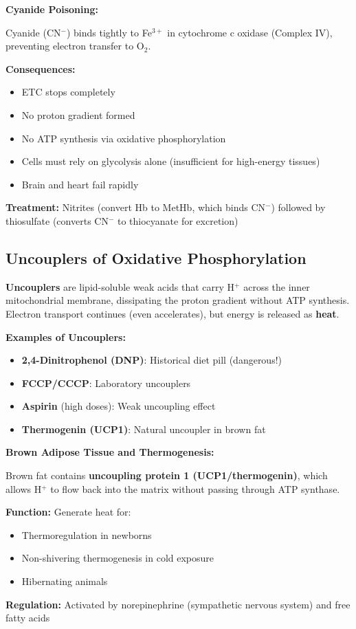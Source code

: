 \begin{example}
\textbf{Cyanide Poisoning:}

Cyanide (CN$^-$) binds tightly to Fe$^{3+}$ in cytochrome c oxidase (Complex IV), preventing electron transfer to O$_2$.

\textbf{Consequences:}
\begin{itemize}
    \item ETC stops completely
    \item No proton gradient formed
    \item No ATP synthesis via oxidative phosphorylation
    \item Cells must rely on glycolysis alone (insufficient for high-energy tissues)
    \item Brain and heart fail rapidly
\end{itemize}

\textbf{Treatment:} Nitrites (convert Hb to MetHb, which binds CN$^-$) followed by thiosulfate (converts CN$^-$ to thiocyanate for excretion)
\end{example}

\subsection{Uncouplers of Oxidative Phosphorylation}

\begin{definition}
\textbf{Uncouplers} are lipid-soluble weak acids that carry H$^+$ across the inner mitochondrial membrane, dissipating the proton gradient without ATP synthesis. Electron transport continues (even accelerates), but energy is released as \textbf{heat}.
\end{definition}

\textbf{Examples of Uncouplers:}
\begin{itemize}
    \item \textbf{2,4-Dinitrophenol (DNP)}: Historical diet pill (dangerous!)
    \item \textbf{FCCP/CCCP}: Laboratory uncouplers
    \item \textbf{Aspirin} (high doses): Weak uncoupling effect
    \item \textbf{Thermogenin (UCP1)}: Natural uncoupler in brown fat
\end{itemize}

\begin{theorem}
\textbf{Brown Adipose Tissue and Thermogenesis:}

Brown fat contains \textbf{uncoupling protein 1 (UCP1/thermogenin)}, which allows H$^+$ to flow back into the matrix without passing through ATP synthase.

\textbf{Function:} Generate heat for:
\begin{itemize}
    \item Thermoregulation in newborns
    \item Non-shivering thermogenesis in cold exposure
    \item Hibernating animals
\end{itemize}

\textbf{Regulation:} Activated by norepinephrine (sympathetic nervous system) and free fatty acids
\end{theorem}

